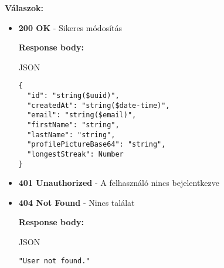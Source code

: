 \documentclass[12pt]{report}
\begin{document}
\begin{description}
    \vspace{0.5cm}
    \textbf{Válaszok:}
    \begin{itemize}
      \item \textbf{200 OK} - Sikeres módosítás

        \textbf{Response body:}
        \begin{codeblock}{JSON}
          \begin{verbatim}
{
  "id": "string($uuid)",
  "createdAt": "string($date-time)",
  "email": "string($email)",
  "firstName": "string",
  "lastName": "string",
  "profilePictureBase64": "string",
  "longestStreak": Number
}
          \end{verbatim}
        \end{codeblock}

      \item \textbf{401 Unauthorized} - A felhasználó nincs bejelentkezve

      \item \textbf{404 Not Found} - Nincs találat

        \textbf{Response body:}
        \begin{codeblock}{JSON}
          \begin{verbatim}
"User not found."
          \end{verbatim}
        \end{codeblock}
    \end{itemize}

\end{description}
\end{document}
